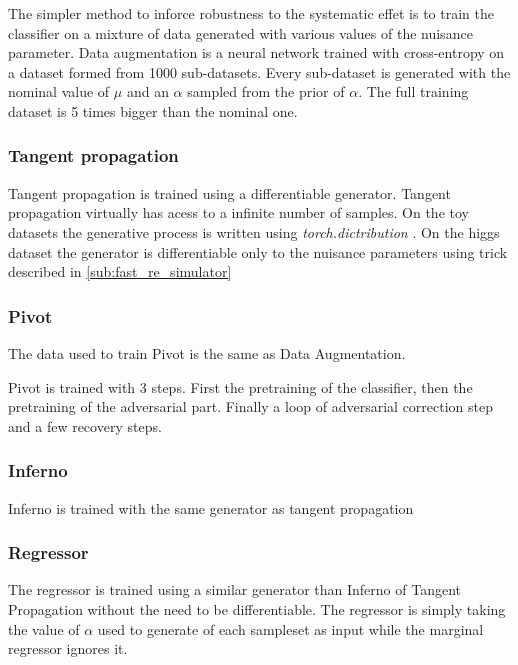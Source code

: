 The simpler method to inforce robustness to the systematic effet is to train the classifier on a mixture of data generated with various values of the nuisance parameter.
Data augmentation is a neural network trained with cross-entropy on a dataset formed from 1000 sub-datasets.
Every sub-dataset is generated with the nominal value of $\mu$ and an $\alpha$ sampled from the prior of $\alpha$.
The full training dataset is 5 times bigger than the nominal one.



\subsubsection{Tangent propagation} %
\label{ssub:tangent_propagation}

Tangent propagation is trained using a differentiable generator.
Tangent propagation virtually has acess to a infinite number of samples.
On the toy datasets the generative process is written using \emph{torch.dictribution} .
On the higgs dataset the generator is differentiable only to the nuisance parameters using trick described in \autoref{sub:fast_re_simulator} 




\subsubsection{Pivot} %
\label{ssub:pivot}


The data used to train Pivot is the same as Data Augmentation.

Pivot is trained with 3 steps.
First the pretraining of the classifier, then the pretraining of the adversarial part.
Finally a loop of adversarial correction step and a few recovery steps.




\subsubsection{Inferno} %
\label{ssub:inferno}

Inferno is trained with the same generator as tangent propagation




\subsubsection{Regressor} %
\label{ssub:regressor}

The regressor is trained using a similar generator than Inferno of Tangent Propagation without the need to be differentiable.
The regressor is simply taking the value of $\alpha$ used to generate of each sampleset as input while the marginal regressor ignores it.






